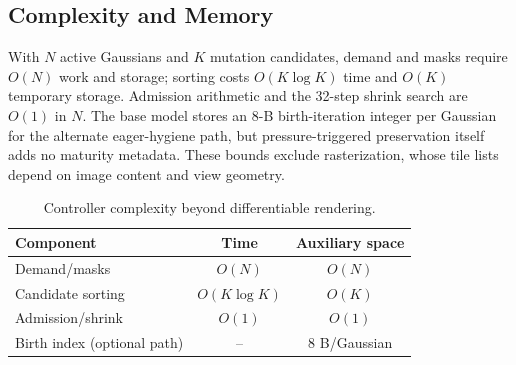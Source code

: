 \subsection{Complexity and Memory}
With $N$ active Gaussians and $K$ mutation candidates, demand and masks require $O(N)$ work and storage; sorting costs $O(K\log K)$ time and $O(K)$ temporary storage. Admission arithmetic and the 32-step shrink search are $O(1)$ in $N$. The base model stores an 8-B birth-iteration integer per Gaussian for the alternate eager-hygiene path, but pressure-triggered preservation itself adds no maturity metadata. These bounds exclude rasterization, whose tile lists depend on image content and view geometry.

\begin{table}[t]
\centering\scriptsize
\caption{Controller complexity beyond differentiable rendering.}
\label{tab:complexity}
\begin{tabular}{lcc}
\toprule
Component & Time & Auxiliary space\\
\midrule
Demand/masks & $O(N)$ & $O(N)$\\
Candidate sorting & $O(K\log K)$ & $O(K)$\\
Admission/shrink & $O(1)$ & $O(1)$\\
Birth index (optional path) & -- & 8 B/Gaussian\\
\bottomrule
\end{tabular}
\end{table}
